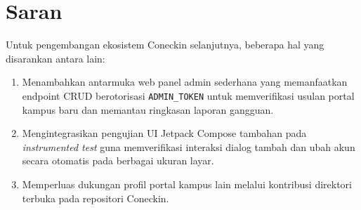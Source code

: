\section{Saran}
Untuk pengembangan ekosistem Coneckin selanjutnya, beberapa hal yang disarankan antara lain:
\begin{enumerate}[leftmargin=*]
  \item Menambahkan antarmuka web panel admin sederhana yang memanfaatkan endpoint CRUD berotorisasi \texttt{ADMIN\_TOKEN} untuk memverifikasi usulan portal kampus baru dan memantau ringkasan laporan gangguan.
  \item Mengintegrasikan pengujian UI Jetpack Compose tambahan pada \textit{instrumented test} guna memverifikasi interaksi dialog tambah dan ubah akun secara otomatis pada berbagai ukuran layar.
  \item Memperluas dukungan profil portal kampus lain melalui kontribusi direktori terbuka pada repositori Coneckin.
\end{enumerate}
